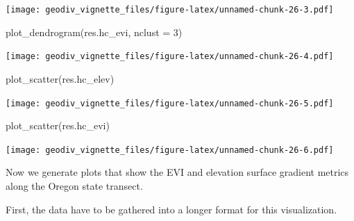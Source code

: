 \documentclass[
]{article}
\newenvironment{Shaded}{\begin{snugshade}}{\end{snugshade}}
\newcommand{\AttributeTok}[1]{\textcolor[rgb]{0.77,0.63,0.00}{#1}}
\newcommand{\CommentTok}[1]{\textcolor[rgb]{0.56,0.35,0.01}{\textit{#1}}}
\newcommand{\ControlFlowTok}[1]{\textcolor[rgb]{0.13,0.29,0.53}{\textbf{#1}}}
\newcommand{\DecValTok}[1]{\textcolor[rgb]{0.00,0.00,0.81}{#1}}
\newcommand{\FunctionTok}[1]{\textcolor[rgb]{0.00,0.00,0.00}{#1}}
\newcommand{\NormalTok}[1]{#1}
\newcommand{\OtherTok}[1]{\textcolor[rgb]{0.56,0.35,0.01}{#1}}
\newcommand{\SpecialCharTok}[1]{\textcolor[rgb]{0.00,0.00,0.00}{#1}}
\newcommand{\StringTok}[1]{\textcolor[rgb]{0.31,0.60,0.02}{#1}}
\begin{document}
\texttt{[image: geodiv\_vignette\_files/figure-latex/unnamed-chunk-26-3.pdf]}

\begin{Shaded}
\begin{Highlighting}[]
\FunctionTok{plot\_dendrogram}\NormalTok{(res.hc\_evi, }\AttributeTok{nclust =} \DecValTok{3}\NormalTok{)}
\end{Highlighting}
\end{Shaded}

\texttt{[image: geodiv\_vignette\_files/figure-latex/unnamed-chunk-26-4.pdf]}

\begin{Shaded}
\begin{Highlighting}[]

\FunctionTok{plot\_scatter}\NormalTok{(res.hc\_elev)}
\end{Highlighting}
\end{Shaded}

\texttt{[image: geodiv\_vignette\_files/figure-latex/unnamed-chunk-26-5.pdf]}

\begin{Shaded}
\begin{Highlighting}[]
\FunctionTok{plot\_scatter}\NormalTok{(res.hc\_evi)}
\end{Highlighting}
\end{Shaded}

\texttt{[image: geodiv\_vignette\_files/figure-latex/unnamed-chunk-26-6.pdf]}

Now we generate plots that show the EVI and elevation surface gradient
metrics along the Oregon state transect.

First, the data have to be gathered into a longer format for this
visualization.

\begin{Shaded}
\end{Shaded}
\end{document}
